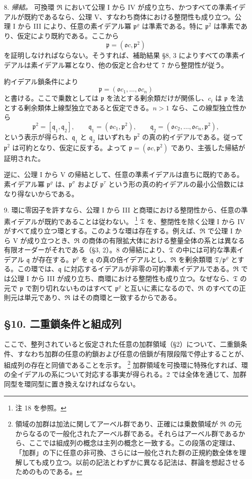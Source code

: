 \documentclass[11pt]{article}
\providecommand{\mR}{\mathfrak{R}}
\providecommand{\mT}{\mathfrak{T}}
\providecommand{\mo}{\mathfrak{o}}
\providecommand{\mpideal}{\mathfrak{p}}
\providecommand{\mq}{\mathfrak{q}}
\begin{document}
8. \emph{帰結。} 可換環 $\mR$ において公理 I から IV が成り立ち、かつすべての準素イデアルが既約であるなら、公理 V、すなわち商体における整閉性も成り立つ。公理 I から III により、任意の素イデアル冪 $\mpideal^\varrho$ は準素である。特に $\mpideal^2$ は準素であり、仮定により既約である。ここから
\[
        \mpideal=(\mo c,\mpideal^2)
\]
を証明しなければならない。そうすれば、補助結果 §8, 3 によりすべての準素イデアルは素イデアル冪となり、他の仮定と合わせて 7 から整閉性が従う。

約イデアル鎖条件により
\[
        \mpideal=(\mo c_1,\ldots,\mo c_n)
\]
と書ける。ここで乗数としては $\mpideal$ を法とする剰余類だけが関係し、$c_i$ は $\mpideal$ を法とする剰余類体上線型独立であると仮定できる。$n>1$ なら、この線型独立性から
\[
        \mpideal^2=[\mq_1,\mq_2],
        \qquad
        \mq_1=(\mo c_1,\mpideal^2),
        \qquad
        \mq_2=(\mo c_2,\ldots,\mo c_n,\mpideal^2),
\]
という表示が得られ、$\mq_1$ と $\mq_2$ はいずれも $\mpideal^2$ の真の約イデアルである。従って $\mpideal^2$ は可約となり、仮定に反する。よって $\mpideal=(\mo c,\mpideal^2)$ であり、主張した帰結が証明された。

逆に、公理 I から V の帰結として、任意の準素イデアルは直ちに既約である。素イデアル冪 $\mpideal^\varrho$ は、$\mpideal^\sigma$ および $\mpideal^\tau$ という形の真の約イデアルの最小公倍数にはなり得ないからである。

9. 環に零因子を許すなら、公理 I から III と商環における整閉性から、任意の準素イデアルが既約であることは従わない。
\footnote{注 18 を参照。}
$\mT$ を、整閉性を除く公理 I から IV がすべて成り立つ環とする。このような環は存在する。例えば、$\mR$ で公理 I から V が成り立つとき、$\mR$ の商体の有限拡大体における整量全体の系とは異なる有限オーダーがそれである（§3, 2）。8 の帰結により、$\mT$ の中には可約な準素イデアル $\mq$ が存在する。$\mpideal^\varrho$ を $\mq$ の真の倍イデアルとし、$\mR$ を剰余類環 $\mT/\mpideal^\varrho$ とする。この環では、$\mq$ に対応するイデアルが非零の可約準素イデアルである。$\mR$ では公理 I から III が成り立ち、商環における整閉性も成り立つ。なぜなら、$\mT$ の元で $\mpideal$ で割り切れないものはすべて $\mpideal^\varrho$ と互いに素になるので、$\mR$ のすべての正則元は単元であり、$\mR$ はその商環と一致するからである。

\subsection*{§10. 二重鎖条件と組成列}

ここで、整列されていると仮定された任意の加群領域（§2）について、二重鎖条件、すなわち加群の任意の約鎖および任意の倍鎖が有限段階で停止することが、組成列の存在と同値であることを示す。
\footnote{領域の加群は加法に関してアーベル群であり、正確には乗数領域が $\mR$ の元からなるので一般化されたアーベル群である。それらはアーベル群であるから、ここでは組成列の概念は主列の概念と一致する。この段落の定理は、「加群」の下に任意の非可換、さらには一般化された群の正規約数全体を理解しても成り立つ。以前の記法とわずかに異なる記法は、群論を想起させるためのものである。}
加群領域を可換環に特殊化すれば、環の全イデアルの系について対応する事実が得られる。2 では全体を通じて、加群同型を環同型に置き換えなければならない。
\end{document}
